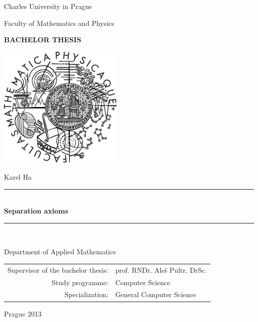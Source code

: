 \documentclass[12pt,a4paper]{report}
\newcommand{\HRule}{\rule{\linewidth}{0.5mm}}
\theoremstyle{plain}
\theoremstyle{definition}
\theoremstyle{remark}
\numberwithin{equation}{section}
\begin{document}


\pagestyle{empty}
\begin{center}

\large

Charles University in Prague

\medskip

Faculty of Mathematics and Physics

\vfill

{\bf\Large BACHELOR THESIS}

\vfill

\centerline{\mbox{\includegraphics[width=60mm]{../img/logo.eps}}}

\vfill
\vspace{5mm}

{\LARGE Karel Ha}

\vspace{15mm}

\HRule \\[0.6cm]
{\LARGE\bfseries Separation axioms} \\[0.2cm]
\HRule \\[1.5cm]

\vfill

Department of Applied Mathematics

\vfill

\begin{tabular}{rl}

Supervisor of the bachelor thesis: & prof. RNDr. Aleš Pultr, DrSc. \\
\noalign{\vspace{2mm}}
Study programme: & Computer Science \\
\noalign{\vspace{2mm}}
Specialization: & General Computer Science \\
\end{tabular}

\vfill

Prague 2013

\end{center}
\end{document}
